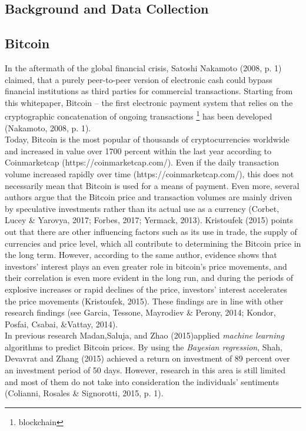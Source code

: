 \documentclass[a4paper,american,12pt]{article}
\begin{document}
\begin{spacing}{1.2}
\clearpage

\section{Background and Data Collection}
\label{sec:Background}
\subsection{Bitcoin}
In the aftermath of the global financial crisis, Satoshi Nakamoto (2008, p. 1) claimed, that a purely peer-to-peer version of electronic cash could bypass financial institutions as third parties for commercial transactions. Starting from this whitepaper, Bitcoin – the first electronic payment system that relies on the cryptographic concatenation of ongoing transactions \footnote{blockchain} has been developed (Nakamoto, 2008, p. 1).\\

Today, Bitcoin is the most popular of thousands of cryptocurrencies worldwide and increased in value over 1700 percent within the last year according to Coinmarketcap (https://coinmarketcap.com/). Even if the daily transaction volume increased rapidly over time (https://coinmarketcap.com/), this does not necessarily mean that Bitcoin is used for a means of payment. Even more, several authors argue that the Bitcoin price and transaction volumes are mainly driven by speculative investments rather than its actual use as a currency (Corbet, Lucey \& Yarovya, 2017; Forbes, 2017; Yermack, 2013). Kristoufek (2015) points out that there are other influencing factors such as its use in trade, the supply of currencies and price level, which all contribute to determining the Bitcoin price in the long term. However, according to the same author, evidence shows that investors’ interest plays an even greater role in bitcoin's price movements, and their correlation is even more evident in the long run, and during the periods of explosive increases or rapid declines of the price, investors’ interest accelerates the price movements (Kristoufek, 2015). These findings are in line with other research findings (see Garcia, Tessone, Mayrodiev \& Perony, 2014; Kondor, Posfai, Csabai, \&Vattay, 2014).\\

In previous research Madan,Saluja, and Zhao (2015)applied \textit{machine learning} algorithms to predict Bitcoin prices. By using the \textit{Bayesian regression}, Shah, Devavrat and Zhang (2015) achieved a return on investment of 89 percent over an investment period of 50 days. However, research in this area is still limited and most of them do not take into consideration the individuals' sentiments (Colianni, Rosales \& Signorotti, 2015, p. 1).\\


\end{spacing}
\end{document}
